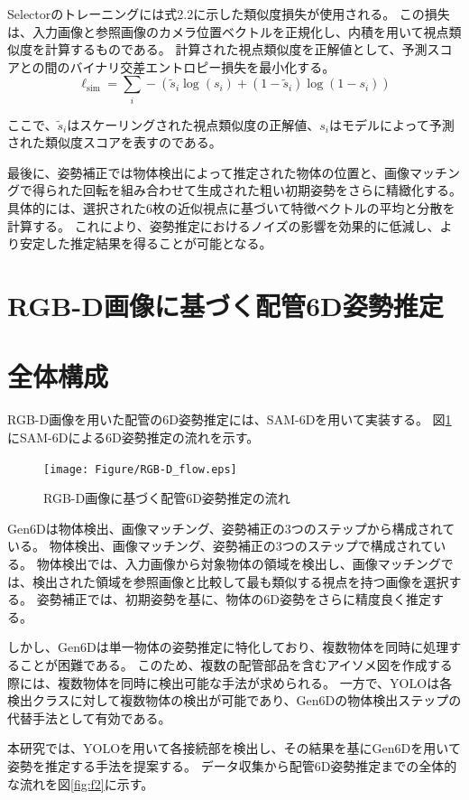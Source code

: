 Selectorのトレーニングには式2.2に示した類似度損失が使用される。
この損失は、入力画像と参照画像のカメラ位置ベクトルを正規化し、内積を用いて視点類似度を計算するものである。
計算された視点類似度を正解値として、予測スコアとの間のバイナリ交差エントロピー損失を最小化する。
\begin{equation}
	\ell_{\text{sim}} = \sum_{i} - \left( \tilde{s}_i \log(s_i) + (1 - \tilde{s}_i) \log(1 - s_i) \right)
	\tag{2.2}
\end{equation}
	
ここで、\(\tilde{s}_i\)はスケーリングされた視点類似度の正解値、\(s_i\)はモデルによって予測された類似度スコアを表すのである。

最後に、姿勢補正では物体検出によって推定された物体の位置と、画像マッチングで得られた回転を組み合わせて生成された粗い初期姿勢をさらに精緻化する。
具体的には、選択された6枚の近似視点に基づいて特徴ベクトルの平均と分散を計算する。
これにより、姿勢推定におけるノイズの影響を効果的に低減し、より安定した推定結果を得ることが可能となる。


\section{RGB-D画像に基づく配管6D姿勢推定}
\section{全体構成}
RGB-D画像を用いた配管の6D姿勢推定には、SAM-6Dを用いて実装する。
図\ref{fig:f6}にSAM-6Dによる6D姿勢推定の流れを示す。
\begin{figure}[htbt]
	\centering
	 \texttt{[image: Figure/RGB-D\_flow.eps]}
	 \caption{RGB-D画像に基づく配管6D姿勢推定の流れ}
	 \label{fig:f6}
\end{figure}

Gen6Dは物体検出、画像マッチング、姿勢補正の3つのステップから構成されている。
物体検出、画像マッチング、姿勢補正の3つのステップで構成されている。
物体検出では、入力画像から対象物体の領域を検出し、画像マッチングでは、検出された領域を参照画像と比較して最も類似する視点を持つ画像を選択する。
姿勢補正では、初期姿勢を基に、物体の6D姿勢をさらに精度良く推定する。

しかし、Gen6Dは単一物体の姿勢推定に特化しており、複数物体を同時に処理することが困難である。
このため、複数の配管部品を含むアイソメ図を作成する際には、複数物体を同時に検出可能な手法が求められる。
一方で、YOLOは各検出クラスに対して複数物体の検出が可能であり、Gen6Dの物体検出ステップの代替手法として有効である。

本研究では、YOLOを用いて各接続部を検出し、その結果を基にGen6Dを用いて姿勢を推定する手法を提案する。
データ収集から配管6D姿勢推定までの全体的な流れを図\ref{fig:f2}に示す。

